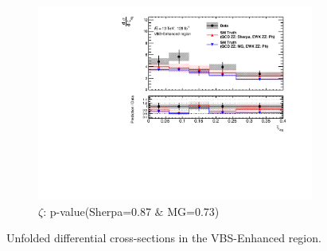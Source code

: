 \begin{figure}[!htb]
\begin{subfigure}{.49\textwidth}
        \includegraphics[width=.98\linewidth]{figures/Results/CrossSection_VBSEnhanced/xs_centrality_SR.pdf}
        \caption{ \footnotesize{$\zeta$: p-value(Sherpa=0.87 $\&$ MG=0.73)} }
    \end{subfigure}
    \caption{Unfolded differential cross-sections in the VBS-Enhanced region.}  \label{fig:unfolded_xs_VBS_Enhanced_b}
\end{figure}